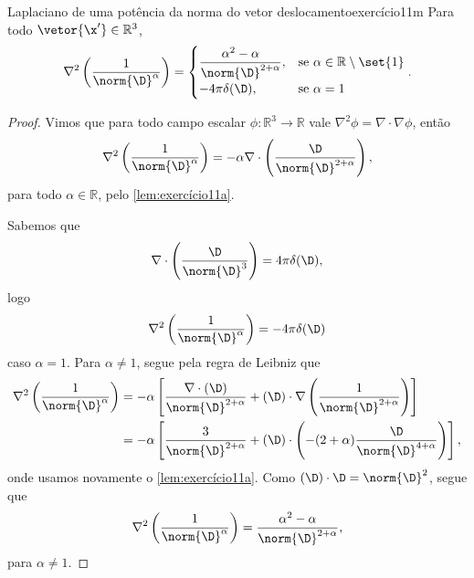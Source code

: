 \begin{lemma}{Laplaciano de uma potência da norma do vetor deslocamento}{exercício11m}
    Para todo \(\vetor{\x'} \in \mathbb{R}^3\),
    \begin{equation*}
        \nabla^2\left(\frac{1}{\norm{\D}^\alpha}\right) = \begin{cases}
            \dfrac{\alpha^2 - \alpha}{\norm{\D}^{2 + \alpha}}, &\text{se } \alpha \in \mathbb{R} \setminus \set{1}\\
            -4\pi  \delta(\D), &\text{se }\alpha = 1\\
    \end{cases}.
    \end{equation*}
\end{lemma}
\begin{proof}
    Vimos que para todo campo escalar \(\phi : \mathbb{R}^3 \to \mathbb{R}\) vale \(\nabla^2 \phi = \nabla \cdot \nabla\phi\), então
    \begin{equation*}
        \nabla^2\left(\frac{1}{\norm{\D}^\alpha}\right) = -\alpha \nabla \cdot \left(\frac{\D}{\norm{\D}^{2+\alpha}}\right),
    \end{equation*}
    para todo \(\alpha \in \mathbb{R}\), pelo \cref{lem:exercício11a}.

    Sabemos que
    \begin{equation*}
        \nabla \cdot \left(\frac{\D}{\norm{\D}^3}\right) = 4\pi \delta(\D),
    \end{equation*}
    logo
    \begin{equation*}
        \nabla^2 \left(\frac{1}{\norm{\D}^\alpha}\right) = -4\pi \delta(\D)
    \end{equation*}
    caso \(\alpha = 1\). Para \(\alpha \neq 1\), segue pela regra de Leibniz que
    \begin{align*}
        \nabla^2 \left(\frac{1}{\norm{\D}^\alpha}\right)
        &= -\alpha \left[\frac{\nabla \cdot (\D)}{\norm{\D}^{2+\alpha}} + (\D) \cdot \nabla\left(\frac{1}{\norm{\D}^{2+\alpha}}\right)\right]\\
        &= -\alpha \left[\frac{3}{\norm{\D}^{2 + \alpha}} + (\D) \cdot \left(-(2+\alpha)\frac{\D}{\norm{\D}^{4 + \alpha}}\right)\right],
    \end{align*}
    onde usamos novamente o \cref{lem:exercício11a}. Como \((\D)\cdot\D = \norm{\D}^2\), segue que
    \begin{equation*}
        \nabla^2\left(\frac{1}{\norm{\D}^\alpha}\right) = \frac{\alpha^2 - \alpha}{\norm{\D}^{2 + \alpha}},
    \end{equation*}
    para \(\alpha \neq 1\).
\end{proof}
